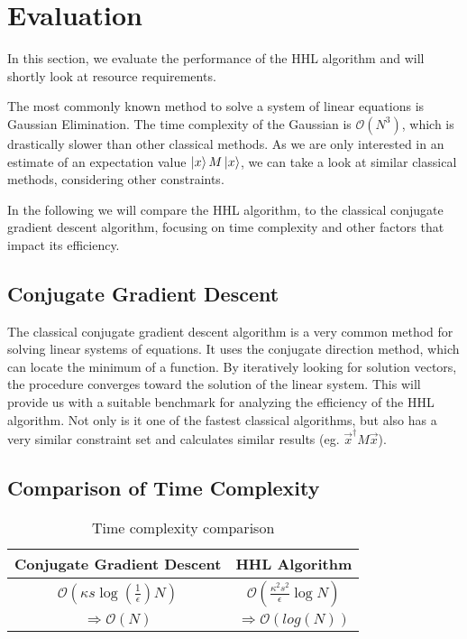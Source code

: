 \section{Evaluation}

\begin{comment}
look at gauß verfahren 
not fastest
look at same constraints 
conjugate gradient descent much faster with similiar requirements
only interested in estimate of $\vec{x}^\dagger M \vec x$
this runs in $ \mathcal{O}(\kappa s log{\left(\frac 1 \epsilon\right)} N ) $
where 
\end{comment}

In this section, we evaluate the performance of the HHL algorithm and will shortly look at resource requirements.

The most commonly known method to solve a system of linear equations is Gaussian Elimination. 
The time complexity of the Gaussian is $\mathcal{O} (N^3)$, which is drastically slower than other classical methods.
As we are only interested in an estimate of an expectation value $\ket x M \ket x$, we can take a look at similar classical methods, considering other constraints.

In the following we will compare the HHL algorithm, to the classical conjugate gradient descent algorithm, focusing on time complexity and other factors that impact its efficiency.

\subsection{Conjugate Gradient Descent}
The classical conjugate gradient descent algorithm is a very common method for solving linear systems of equations. 
It uses the conjugate direction method, which can locate the minimum of a function. 
By iteratively looking for solution vectors, the procedure converges toward the solution of the linear system.
This will provide us with a suitable benchmark for analyzing the efficiency of the HHL algorithm.
Not only is it one of the fastest classical algorithms, but also has a very similar constraint set and calculates similar results (eg. $\vec{x}^\dagger M \vec x$).

\subsection{Comparison of Time Complexity }
\begin{table}[htbp]
    \caption{Time complexity comparison}
    \begin{center}
    \begin{tabular}{|c|c|}
    \hline
    \textbf{Conjugate Gradient Descent} & \textbf{HHL Algorithm} \\
    \hline
    $\mathcal{O}(\kappa s \log\left(\frac{1}{\epsilon}\right) N)$  &  $\mathcal{O}\left(\frac{\kappa^2s^2}{\epsilon}\log N\right)$\\
    \hline
    $\Rightarrow \mathcal{O} (N)$ & $\Rightarrow \mathcal{O} (log(N))$\\ 
    \hline
    \end{tabular}
    \end{center}
\end{table}

